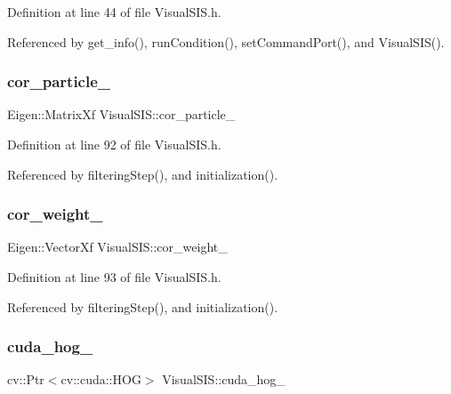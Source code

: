 Definition at line 44 of file Visual\+S\+I\+S.\+h.



Referenced by get\+\_\+info(), run\+Condition(), set\+Command\+Port(), and Visual\+S\+I\+S().

\mbox{\label{classVisualSIS_ab2f16295dc79084196a8cb5db6a3696e}} 
\subsubsection{\texorpdfstring{cor\+\_\+particle\+\_\+}{cor\_particle\_}}
{\footnotesize\ttfamily Eigen\+::\+Matrix\+Xf Visual\+S\+I\+S\+::cor\+\_\+particle\+\_\+\hspace{0.3cm}{\ttfamily [private]}}



Definition at line 92 of file Visual\+S\+I\+S.\+h.



Referenced by filtering\+Step(), and initialization().

\mbox{\label{classVisualSIS_a497a31b9417a12005b6253bc100ab476}} 
\subsubsection{\texorpdfstring{cor\+\_\+weight\+\_\+}{cor\_weight\_}}
{\footnotesize\ttfamily Eigen\+::\+Vector\+Xf Visual\+S\+I\+S\+::cor\+\_\+weight\+\_\+\hspace{0.3cm}{\ttfamily [private]}}



Definition at line 93 of file Visual\+S\+I\+S.\+h.



Referenced by filtering\+Step(), and initialization().

\mbox{\label{classVisualSIS_aebdc06fc72c1e391c69bdcbd19fde848}} 
\subsubsection{\texorpdfstring{cuda\+\_\+hog\+\_\+}{cuda\_hog\_}}
{\footnotesize\ttfamily cv\+::\+Ptr$<$cv\+::cuda\+::\+H\+OG$>$ Visual\+S\+I\+S\+::cuda\+\_\+hog\+\_\+\hspace{0.3cm}{\ttfamily [protected]}}




